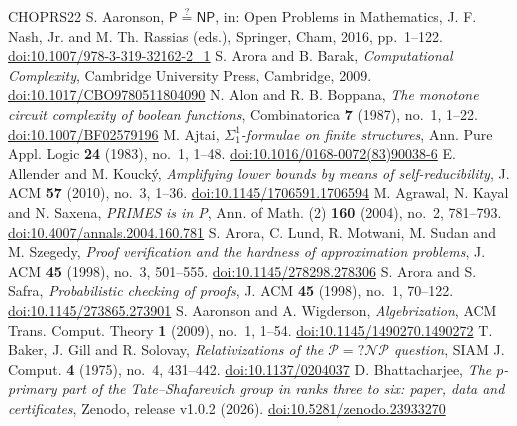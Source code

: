\documentclass[11pt,reqno]{amsart}
\numberwithin{equation}{section}
\theoremstyle{plain}
\theoremstyle{definition}
\theoremstyle{remark}
\begin{document}
\FloatBarrier
\begingroup\raggedright\small
\begin{thebibliography}{CHOPRS22}
 S. Aaronson, \emph{$\mathsf P\overset{?}{=}\mathsf{NP}$}, in: Open Problems in Mathematics, J. F. Nash, Jr. and M. Th. Rassias (eds.), Springer, Cham, 2016, pp.~1--122. \href{https://doi.org/10.1007/978-3-319-32162-2_1}{doi:10.1007/978-3-319-32162-2\_1}
 S. Arora and B. Barak, \emph{Computational Complexity}, Cambridge University Press, Cambridge, 2009. \href{https://doi.org/10.1017/CBO9780511804090}{doi:10.1017/CBO9780511804090}
 N. Alon and R. B. Boppana, \emph{The monotone circuit complexity of boolean functions}, Combinatorica \textbf{7} (1987), no.~1, 1--22. \href{https://doi.org/10.1007/BF02579196}{doi:10.1007/BF02579196}
 M. Ajtai, \emph{$\Sigma^1_1$-formulae on finite structures}, Ann. Pure Appl. Logic \textbf{24} (1983), no.~1, 1--48. \href{https://doi.org/10.1016/0168-0072(83)90038-6}{doi:10.1016/0168-0072(83)90038-6}
 E. Allender and M. Kouck{\'y}, \emph{Amplifying lower bounds by means of self-reducibility}, J. ACM \textbf{57} (2010), no.~3, 1--36. \href{https://doi.org/10.1145/1706591.1706594}{doi:10.1145/1706591.1706594}
 M. Agrawal, N. Kayal and N. Saxena, \emph{PRIMES is in P}, Ann. of Math. (2) \textbf{160} (2004), no.~2, 781--793. \href{https://doi.org/10.4007/annals.2004.160.781}{doi:10.4007/annals.2004.160.781}
 S. Arora, C. Lund, R. Motwani, M. Sudan and M. Szegedy, \emph{Proof verification and the hardness of approximation problems}, J. ACM \textbf{45} (1998), no.~3, 501--555. \href{https://doi.org/10.1145/278298.278306}{doi:10.1145/278298.278306}
 S. Arora and S. Safra, \emph{Probabilistic checking of proofs}, J. ACM \textbf{45} (1998), no.~1, 70--122. \href{https://doi.org/10.1145/273865.273901}{doi:10.1145/273865.273901}
 S. Aaronson and A. Wigderson, \emph{Algebrization}, ACM Trans. Comput. Theory \textbf{1} (2009), no.~1, 1--54. \href{https://doi.org/10.1145/1490270.1490272}{doi:10.1145/1490270.1490272}
 T. Baker, J. Gill and R. Solovay, \emph{Relativizations of the $\mathcal P=?\mathcal{NP}$ question}, SIAM J. Comput. \textbf{4} (1975), no.~4, 431--442. \href{https://doi.org/10.1137/0204037}{doi:10.1137/0204037}
 D. Bhattacharjee, \emph{The $p$-primary part of the Tate--Shafarevich group in ranks three to six: paper, data and certificates}, Zenodo, release v1.0.2 (2026). \href{https://doi.org/10.5281/zenodo.23933270}{doi:10.5281/zenodo.23933270}

\end{thebibliography}
\end{document}
